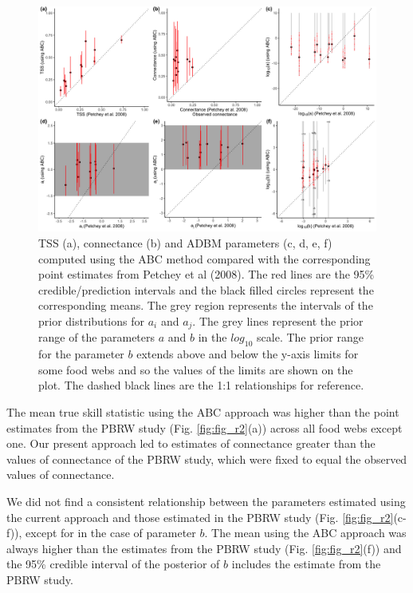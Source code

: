 \documentclass{article}
\providecommand{\DIFaddbeginFL}{} %
\providecommand{\DIFaddendFL}{} %
\providecommand{\DIFdelbeginFL}{} %
\providecommand{\DIFdelendFL}{} %
\newcommand{\DIFscaledelfig}{0.5}
\newlength{\DIFdelgraphicswidth} %
\newlength{\DIFdelgraphicsheight} %
\newcommand{\DIFaddincludegraphics}[2][]{{\color{blue}\fbox{\DIFOincludegraphics[#1]{#2}}}} %
\newcommand{\DIFdelincludegraphics}[2][]{%
\sbox{\DIFdelgraphicsbox}{\DIFOincludegraphics[#1]{#2}}%
\settoboxwidth{\DIFdelgraphicswidth}{\DIFdelgraphicsbox} %
\settoboxtotalheight{\DIFdelgraphicsheight}{\DIFdelgraphicsbox} %
\scalebox{\DIFscaledelfig}{%
\parbox[b]{\DIFdelgraphicswidth}{\usebox{\DIFdelgraphicsbox}\\[-\baselineskip] \rule{\DIFdelgraphicswidth}{0em}}\llap{\resizebox{\DIFdelgraphicswidth}{\DIFdelgraphicsheight}{%
\setlength{\unitlength}{\DIFdelgraphicswidth}%
\begin{picture}(1,1)%
\thicklines\linethickness{2pt} %
{\color[rgb]{1,0,0}\put(0,0){\framebox(1,1){}}}%
{\color[rgb]{1,0,0}\put(0,0){\line( 1,1){1}}}%
{\color[rgb]{1,0,0}\put(0,1){\line(1,-1){1}}}%
\end{picture}%
}\hspace*{3pt}}} %
} %
\DeclareRobustCommand{\DIFaddbeginFL}{\DIFOaddbeginFL \let\includegraphics\DIFaddincludegraphics} %
\DeclareRobustCommand{\DIFaddendFL}{\DIFOaddendFL \let\includegraphics\DIFOincludegraphics} %
\DeclareRobustCommand{\DIFdelbeginFL}{\DIFOdelbeginFL \let\includegraphics\DIFdelincludegraphics} %
\DeclareRobustCommand{\DIFdelendFL}{\DIFOaddendFL \let\includegraphics\DIFOincludegraphics} %
\begin{document}
\begin{figure}

{\centering \DIFdelbeginFL %
\DIFdelendFL \DIFaddbeginFL \includegraphics[width=500px]{../results/misc/ABC_vs_point_estimates} 
\DIFaddendFL 

}

\caption{\label{fig:fig_r2} TSS (a), connectance (b) and ADBM parameters (c, d, e, f) computed using the ABC method compared with the corresponding point estimates from Petchey et al (2008). The red lines are the 95\% credible/prediction intervals and the black filled circles represent the corresponding means. The grey region represents the intervals of the prior distributions for $a_i$ and $a_j$. The grey lines represent the prior range of the parameters $a$ and $b$ in the $log_{10}$ scale. The prior range for the parameter $b$ extends above and below the y-axis limits for some food webs and so the values of the limits are shown on the plot. The dashed black lines are the 1:1 relationships for reference.}\label{fig:unnamed-chunk-7}
\end{figure}

The mean true skill statistic using the ABC approach was higher than the
point estimates from the PBRW study (Fig. \ref{fig:fig_r2}(a)) across
all food webs except one. Our present approach led to estimates of
connectance greater than the values of connectance of the PBRW study,
which were fixed to equal the observed values of connectance.

We did not find a consistent relationship between the parameters
estimated using the current approach and those estimated in the PBRW
study (Fig. \ref{fig:fig_r2}(c-f)), except for in the case of parameter
\(b\). The mean using the ABC approach was always higher than the
estimates from the PBRW study (Fig. \ref{fig:fig_r2}(f)) and the 95\%
credible interval of the posterior of \(b\) includes the estimate from
the PBRW study.
\end{document}
